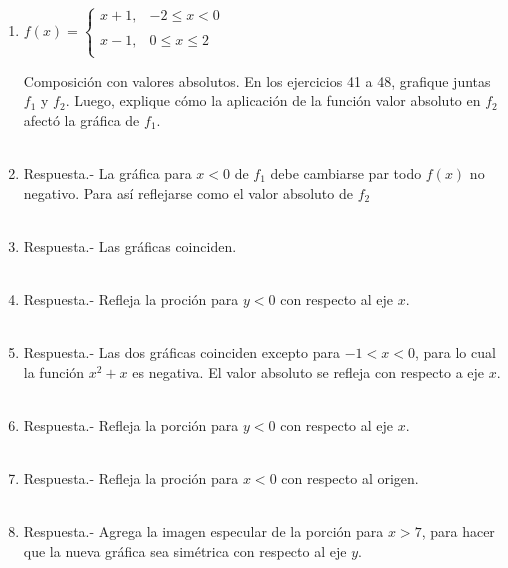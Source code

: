 \begin{enumerate}[\bfseries 1.]
\item $f(x) = \left\{\begin{array}{lr}
	x+1,&-2\leq x < 0\\\\
	x-1,&0\leq x \leq 2\\
    \end{array}\right.$
    \vspace{.5cm}

Composición con valores absolutos.\; En los ejercicios 41 a 48, grafique juntas $f_1$ y $f_2$. Luego, explique cómo la aplicación de la función valor absoluto en $f_2$ afectó la gráfica de $f_1$.\\\\

\item Respuesta.-\; La gráfica para $x<0$ de $f_1$ debe cambiarse par todo $f(x)$ no negativo. Para así reflejarse como el valor absoluto de $f_2$\\\\

\item Respuesta.-\; Las gráficas coinciden.\\\\

\item Respuesta.-\; Refleja la proción para $y<0$ con respecto al eje $x$.\\\\

\item Respuesta.-\; Las dos gráficas coinciden excepto para $-1<x<0$, para lo cual la función $x^2 + x$ es negativa. El valor absoluto se refleja con respecto a eje $x$.\\\\

\item Respuesta.-\; Refleja la porción para $y<0$ con respecto al eje $x$.\\\\

\item Respuesta.-\; Refleja la proción para $x<0$ con respecto al origen.\\\\

\item Respuesta.-\; Agrega la imagen especular de la porción para $x> 7$, para hacer que la nueva gráfica sea simétrica con respecto al eje $y$.\\\\


\end{enumerate}
